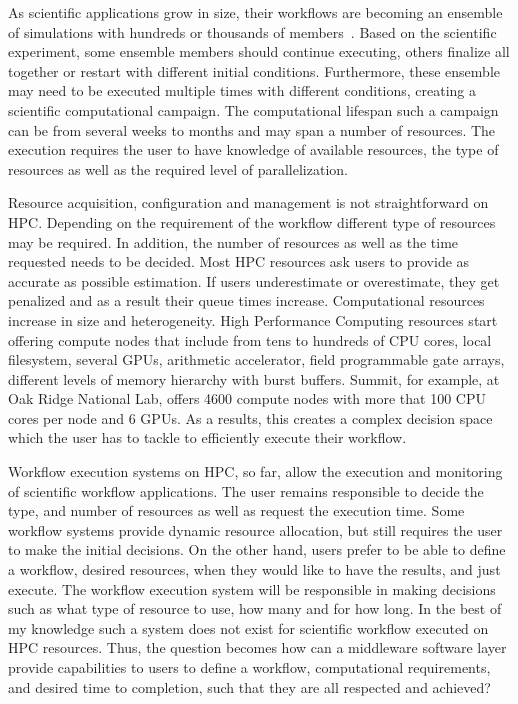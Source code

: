As scientific applications grow in size, their workflows are becoming an ensemble 
of simulations with hundreds or thousands of members~\cite{malawski2015algorithms,rietmann2012forward}. 
Based on the scientific experiment, some ensemble members should continue executing, 
others finalize all together or restart with different initial conditions. Furthermore, 
these ensemble may need to be executed multiple times with different conditions, 
creating a  scientific computational campaign. The computational lifespan such a 
campaign can be from several weeks to months and may span a number of resources. 
The execution requires the user to have knowledge of available resources, the type 
of resources as well as the required level of parallelization.

Resource acquisition, configuration and management is not straightforward on HPC. 
Depending on the requirement of the workflow different type of resources may be 
required. In addition, the number of resources as well as the time requested needs 
to be decided. Most HPC resources ask users to provide as accurate as possible 
estimation. If users underestimate or overestimate, they get penalized and as a 
result their queue times increase. Computational resources increase in size and 
heterogeneity. High Performance Computing resources start offering compute nodes 
that include from tens to hundreds of CPU cores, local filesystem, several GPUs, 
arithmetic accelerator, field programmable gate arrays, different levels of memory 
hierarchy with burst buffers. Summit, for example, at Oak Ridge National Lab, 
offers 4600 compute nodes with more that 100 CPU cores per node and 6 GPUs. As a 
results, this creates a complex decision space which the user has to tackle to 
efficiently execute their workflow.

Workflow execution systems on HPC, so far, allow the execution and monitoring of 
scientific workflow applications. The user remains responsible to decide the type, 
and number of resources as well as request the execution time. Some workflow 
systems provide dynamic resource allocation, but still requires the user to make 
the initial decisions. On the other hand, users prefer to be able to define a 
workflow, desired resources, when they would like to have the results, and just 
execute. The workflow execution system will be responsible in making decisions 
such as what type of resource to use, how many and for how long. In the best of 
my knowledge such a system does not exist for scientific workflow executed on HPC 
resources. Thus, the question becomes how can a middleware software layer provide 
capabilities to users to define a workflow, computational requirements, and 
desired time to completion, such that they are all respected and achieved?

